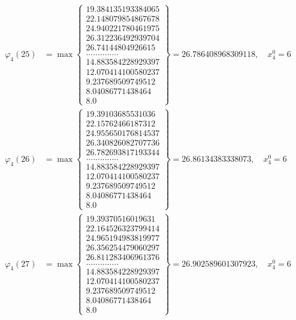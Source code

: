 \documentclass{article}
\begin{document}
\begin{align*}
  
  
  
\varphi_{4}(25) &= \max \left\{ \begin{array}{c}
19.384135193384065 \\
 22.148079854867678 \\
 24.940221780461975 \\
 26.312236492939704 \\
 26.74144804926615 \\
 .............. \\
 14.883584228929397 \\
 12.070414100580237 \\
 9.237689509749512 \\
 8.04086771438464 \\
 8.0
\end{array} \right\} = 26.786408968309118, \quad x_{4}^0 = 6\\
  
  
  
  
\varphi_{4}(26) &= \max \left\{ \begin{array}{c}
19.39103685531036 \\
 22.15762466187312 \\
 24.955650176814537 \\
 26.340826082707736 \\
 26.782693817193344 \\
 .............. \\
 14.883584228929397 \\
 12.070414100580237 \\
 9.237689509749512 \\
 8.04086771438464 \\
 8.0
\end{array} \right\} = 26.86134383338073, \quad x_{4}^0 = 6\\
  
  
  
  
\varphi_{4}(27) &= \max \left\{ \begin{array}{c}
19.39370516019631 \\
 22.164526323799414 \\
 24.965194983819977 \\
 26.356254479060297 \\
 26.811283406961376 \\
 .............. \\
 14.883584228929397 \\
 12.070414100580237 \\
 9.237689509749512 \\
 8.04086771438464 \\
 8.0
\end{array} \right\} = 26.902589601307923, \quad x_{4}^0 = 6\\
  

\end{align*}
\end{document}
